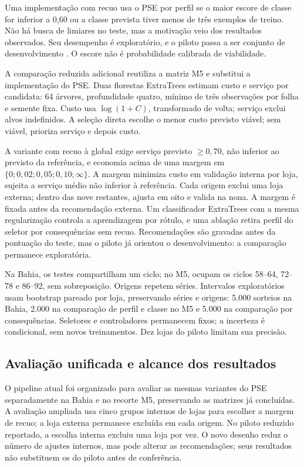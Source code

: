 \documentclass[preprint,12pt]{elsarticle}
\begin{document}
Uma implementação com recuo usa o PSE por perfil se o maior escore de classe for inferior a 0,60 ou a classe prevista tiver menos de três exemplos de treino. Não há busca de limiares no teste, mas a motivação veio dos resultados observados. Seu desempenho é exploratório, e o piloto passa a ser conjunto de desenvolvimento \cite{CawleyTalbot2010}. O escore não é probabilidade calibrada de viabilidade.

A comparação reduzida adicional reutiliza a matriz M5 e substitui a implementação do PSE. Duas florestas ExtraTrees estimam custo e serviço por candidata: 64 árvores, profundidade quatro, mínimo de três observações por folha e semente fixa. Custo usa $\log(1+C)$, transformado de volta; serviço exclui alvos indefinidos. A seleção direta escolhe o menor custo previsto viável; sem viável, prioriza serviço e depois custo.

A variante com recuo à global exige serviço previsto $\geq0{,}70$, não inferior ao previsto da referência, e economia acima de uma margem em $\{0;0{,}02;0{,}05;0{,}10;\infty\}$. A margem minimiza custo em validação interna por loja, sujeita a serviço médio não inferior à referência. Cada origem exclui uma loja externa; dentro das nove restantes, ajusta em oito e valida na nona. A margem é fixada antes da recomendação externa. Um classificador ExtraTrees com a mesma regularização controla a aprendizagem por rótulo, e uma ablação retira perfil do seletor por consequências sem recuo. Recomendações são gravadas antes da pontuação do teste, mas o piloto já orientou o desenvolvimento: a comparação permanece exploratória.

Na Bahia, os testes compartilham um ciclo; no M5, ocupam os ciclos 58--64, 72--78 e 86--92, sem sobreposição. Origens repetem séries. Intervalos exploratórios usam bootstrap pareado por loja, preservando séries e origens: 5.000 sorteios na Bahia, 2.000 na comparação de perfil e classe no M5 e 5.000 na comparação por consequências. Seletores e controladores permanecem fixos; a incerteza é condicional, sem novos treinamentos. Dez lojas do piloto limitam sua precisão.

\subsection{Avaliação unificada e alcance dos resultados}
O pipeline atual foi organizado para avaliar as mesmas variantes do PSE separadamente na Bahia e no recorte M5, preservando as matrizes já concluídas. A avaliação ampliada usa cinco grupos internos de lojas para escolher a margem de recuo; a loja externa permanece excluída em cada origem. No piloto reduzido reportado, a escolha interna excluiu uma loja por vez. O novo desenho reduz o número de ajustes internos, mas pode alterar as recomendações; seus resultados não substituem os do piloto antes de conferência.
\end{document}
